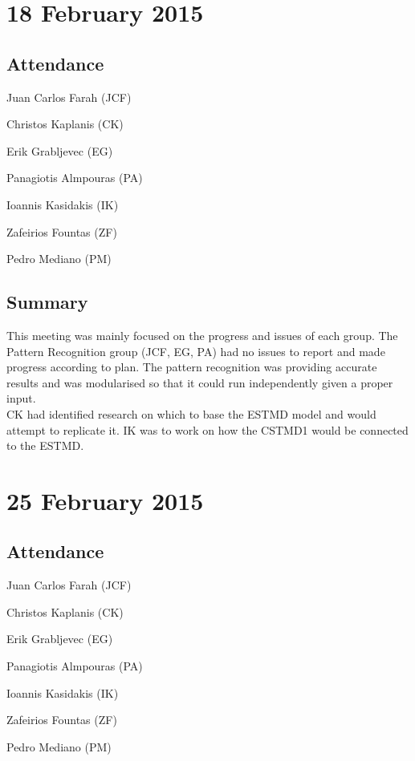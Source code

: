 \documentclass[a4paper,11pt]{article}
\begin{document}
\begin{appendices}
\maketitle
\section*{18 February 2015}
\subsection*{Attendance}
\begin{compactenum}
\item Juan Carlos Farah (JCF)
\item Christos Kaplanis (CK)
\item Erik Grabljevec (EG)
\item Panagiotis Almpouras (PA)
\item Ioannis Kasidakis (IK)
\item Zafeirios Fountas (ZF)
\item Pedro Mediano (PM)
\end{compactenum}

\subsection*{Summary}
This meeting was mainly focused on the progress and issues of each group. The Pattern Recognition group (JCF, EG, PA) had no issues to report and made progress according to plan. The pattern recognition was providing accurate results and was modularised so that it could run independently given a proper input.
\\ CK had identified research on which to base the ESTMD model and would attempt to replicate it. IK was to work on how the CSTMD1 would be connected to the ESTMD.

\maketitle
\section*{25 February 2015}
\subsection*{Attendance}
\begin{compactenum}
\item Juan Carlos Farah (JCF)
\item Christos Kaplanis (CK)
\item Erik Grabljevec (EG)
\item Panagiotis Almpouras (PA)
\item Ioannis Kasidakis (IK)
\item Zafeirios Fountas (ZF)
\item Pedro Mediano (PM)
\end{compactenum}


\end{appendices}
\end{document}
